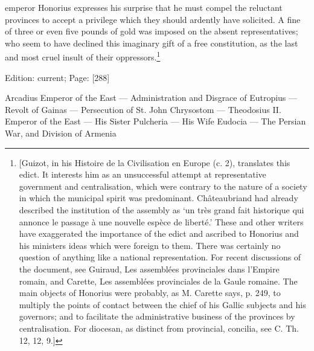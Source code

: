 emperor Honorius expresses his surprise that he must compel the reluctant provinces to accept a privilege which they should ardently have solicited. A fine of three or even five pounds of gold was imposed on the absent representatives; who seem to have declined this imaginary gift of a free constitution, as the last and most cruel insult of their oppressors.\footnote{[Guizot, in his Histoire de la Civilisation en Europe (c. 2), translates this edict. It interests him as an unsuccessful attempt at representative government and centralisation, which were contrary to the nature of a society in which the municipal spirit was predominant. Châteaubriand had already described the institution of the assembly as \texthebrew{‘}un très grand fait historique qui annonce le passage à une nouvelle espèce de liberté.\texthebrew{}’ These and other writers have exaggerated the importance of the edict and ascribed to Honorius and his ministers ideas which were foreign to them. There was certainly no question of anything like a national representation. For recent discussions of the document, see Guiraud, Les assemblées provinciales dans l\texthebrew{}’Empire romain, and Carette, Les assemblées provinciales de la Gaule romaine. The main objects of Honorius were probably, as M. Carette says, p. 249, to multiply the points of contact between the chief of his Gallic subjects and his governors; and to facilitate the administrative business of the provinces by centralisation. For diocesan, as distinct from provincial, concilia, see C. Th. 12, 12, 9.]}

Edition: current; Page: [288]


Arcadius Emperor of the East \texthebrew{—} Administration and Disgrace of Eutropius \texthebrew{—} Revolt of Gainas \texthebrew{—} Persecution of St. John Chrysostom \texthebrew{—} Theodosius II. Emperor of the East \texthebrew{—} His Sister Pulcheria \texthebrew{—} His Wife Eudocia \texthebrew{—} The Persian War, and Division of Armenia


